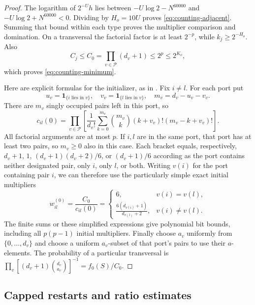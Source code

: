 \begin{proof}
The logarithm of $2^{-U}h$ lies between
$-U\log2-N^{60000}$ and $-U\log2+N^{60000}<0$.
Dividing by $H_o=10U$ proves \eqref{eq:counting-adjacent}.
Summing that bound within each type proves the multiplier comparison
and domination.  On a transversal the factorial factor is at least
$2^{-p}$, while $k_j\geq2^{-H_o}$.  Also
\[
 C_j\leq C_0=\prod_{v\in\mathcal P}(d_v+1)\leq2^p\leq2^{K_o},
\]
which proves \eqref{eq:counting-minimum}.

Here are explicit formulas for the initializer, as in
\cite[Lemma~7.1, ``Exact initialization'']{CB}.  Fix $i\ne l$.
For each port put
\[
 u_v=\mathbf1_{\{i\text{ lies in }v\}},\quad
 v_v=\mathbf1_{\{l\text{ lies in }v\}},\quad
 m_v=d_v-u_v-v_v.
\]
There are $m_v$ singly occupied pairs left in this port, so
\begin{equation}
 c_{il}(0)=\prod_{v\in\mathcal P}
 \left[\frac1{d_v!}\sum_{k=0}^{m_v}
      \binom{m_v}{k}(k+v_v)!(m_v-k+v_v)!\right].
 \label{eq:counting-initial-defect}
\end{equation}
All factorial arguments are at most $p$.  If $i,l$ are in the same
port, that port has at least two pairs, so $m_v\geq0$ also in this case.
Each bracket equals, respectively,
$d_v+1$, $1$, $(d_v+1)(d_v+2)/6$, or $(d_v+1)/6$ according as
the port contains neither designated pair, only $i$, only $l$, or both.
Writing $v(i)$ for the port containing pair $i$, we can therefore use
the particularly simple exact initial multipliers
\begin{equation}
 w_{il}^{(0)}=\frac{C_0}{c_{il}(0)}=
 \begin{cases}
 6,&v(i)=v(l),\\[1mm]
 \displaystyle\frac{6(d_{v(i)}+1)}{d_{v(l)}+2},&v(i)\ne v(l).
 \end{cases}
 \label{eq:counting-initial-multipliers}
\end{equation}
The finite sums or these simplified expressions give polynomial bit
bounds, including all $p(p-1)$ initial multipliers.
Finally choose $a_v$ uniformly from $\{0,\ldots,d_v\}$ and choose
a uniform $a_v$-subset of that port's pairs to use their $a$-elements.
The probability of a particular transversal is
$\prod_v[(d_v+1)\binom{d_v}{a_v}]^{-1}=f_0(S)/C_0$.
\end{proof}

\subsection{Capped restarts and ratio estimates}

